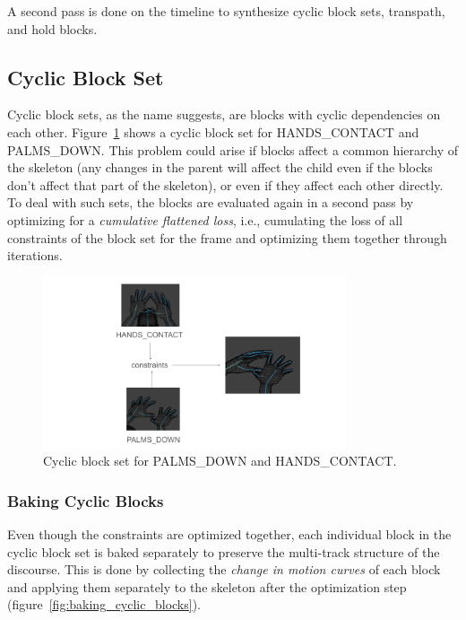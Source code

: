 \documentclass[../../main.tex]{subfiles}
\begin{document}
A second pass is done on the timeline to synthesize cyclic block sets, transpath, and hold blocks.

\subsection{Cyclic Block Set}
\label{ch:multi_track:second_pass:cyclic_blocks}

Cyclic block sets, as the name suggests, are blocks with cyclic dependencies on each other. Figure~\ref{fig:cyclic_blocks} shows a cyclic block set for HANDS\_CONTACT and PALMS\_DOWN. This problem could arise if blocks affect a common hierarchy of the skeleton (any changes in the parent will affect the child even if the blocks don't affect that part of the skeleton), or even if they affect each other directly. To deal with such sets, the blocks are evaluated again in a second pass by optimizing for a \emph{cumulative flattened loss}, i.e., cumulating the loss of all constraints of the block set for the frame and optimizing them together through iterations.

\begin{figure}[h]
    \centering
    \includegraphics[width=0.8\textwidth]{chapters/multi_track/images/cyclic_blocks.png}
    \caption{Cyclic block set for PALMS\_DOWN and HANDS\_CONTACT.}
    \label{fig:cyclic_blocks}
\end{figure}

\subsubsection{Baking Cyclic Blocks}
\label{ch:multi_track:second_pass:cyclic_blocks:baking_cyclic_blocks}

Even though the constraints are optimized together, each individual block in the cyclic block set is baked separately to preserve the multi-track structure of the discourse. This is done by collecting the \emph{change in motion curves} of each block and applying them separately to the skeleton after the optimization step (figure~\ref{fig:baking_cyclic_blocks}).
\end{document}
